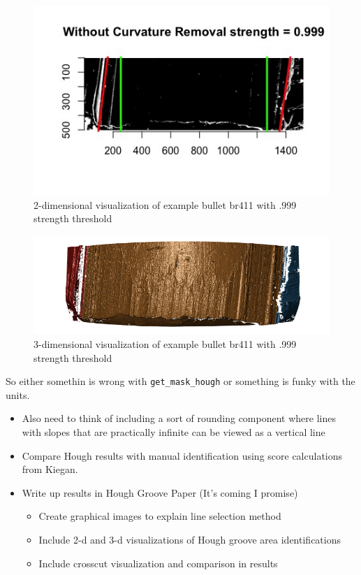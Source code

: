 \documentclass[]{book}
\providecommand{\tightlist}{%
  \setlength{\itemsep}{0pt}\setlength{\parskip}{0pt}}
\begin{document}
\begin{figure}

{\centering \includegraphics[width=0.5\linewidth]{images/bullets/Hough_project/br411_2d} 

}

\caption{2-dimensional visualization of example bullet br411 with .999 strength threshold}\label{fig:unnamed-chunk-9}
\end{figure}

\begin{figure}

{\centering \includegraphics[width=0.5\linewidth]{images/bullets/Hough_project/br411_3d} 

}

\caption{3-dimensional visualization of example bullet br411 with .999 strength threshold}\label{fig:unnamed-chunk-10}
\end{figure}

So either somethin is wrong with \texttt{get\_mask\_hough} or something is funky with the units.

\begin{itemize}
\item
  Also need to think of including a sort of rounding component where lines with slopes that are practically infinite can be viewed as a vertical line
\item
  Compare Hough results with manual identification using score calculations from Kiegan.
\item
  Write up results in Hough Groove Paper (It's coming I promise)

  \begin{itemize}
  \tightlist
  \item
    Create graphical images to explain line selection method
  \item
    Include 2-d and 3-d visualizations of Hough groove area identifications
  \item
    Include crosscut visualization and comparison in results
  \end{itemize}
\end{itemize}
\end{document}
